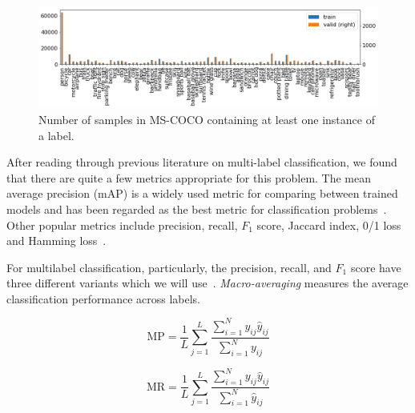\documentclass[12pt,journal,compsoc]{IEEEtran}
\begin{document}
\begin{figure}[!t]
\normalsize
\includegraphics[width=\linewidth]{mscoco_label_counts.png}
\caption{Number of samples in MS-COCO containing at least one instance of a label.}
\label{coco_label_counts}
\vspace*{4pt}
\end{figure}



After reading through previous literature on multi-label classification, we found that there are quite a few metrics appropriate for this problem. The mean average precision (mAP) is a widely used metric for comparing between trained models and has been regarded as the best metric for classification problems~\cite{Lavrenko_2014}.  Other popular metrics include precision, recall, $F_1$ score, Jaccard index, 0/1 loss and Hamming loss~\cite{Tsoumakas:2007,SOKOLOVA2009427,Herrera:2016}. 

For multilabel classification, particularly, the precision, recall, and $F_1$ score have three different variants which we will use~\cite{MADJAROV20123084,WuZ16,Koyejo:2015,GongJLTI13}. \textit{Macro-averaging} measures the average classification performance across labels.  

\begin{equation}
\mathrm{MP} = \frac{1}{L}\sum_{j=1}^{L}\frac{\sum_{i=1}^{N}y_{ij}\hat{y}_{ij}}{\sum_{i=1}^{N}y_{ij}}
\label{eq:MP}
\end{equation}

\begin{equation}
\mathrm{MR} = \frac{1}{L}\sum_{j=1}^{L}\frac{\sum_{i=1}^{N}y_{ij}\hat{y}_{ij}}{\sum_{i=1}^{N}\hat{y}_{ij}}
\label{eq:MR}
\end{equation}
\end{document}
